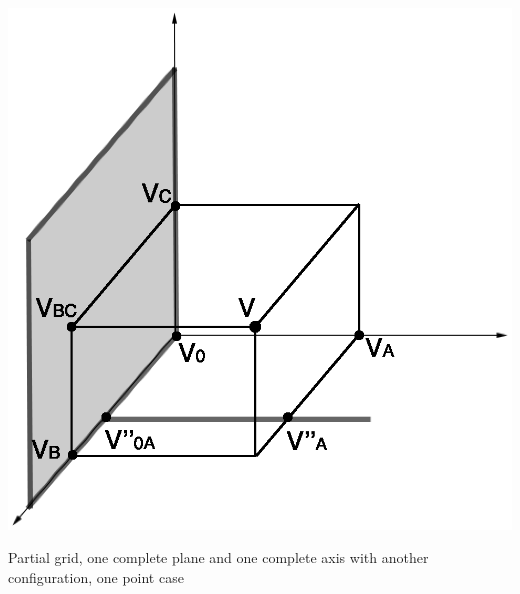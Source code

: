 \begin{multicols}{2}
{\begin{figurehere}
\begin{center}
\includegraphics[scale=0.40]{Interpolation-PLAX-INSbis.eps}
\caption{Partial grid, one complete plane and one complete axis with another configuration, one point case}
\label{figNCRPLAXINSbis}
\end{center}
\end{figurehere}

}
\end{multicols}

\clearpage
